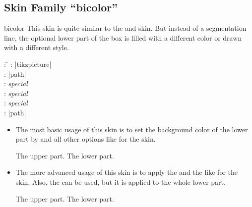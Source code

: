 \subsection{Skin Family \enquote{bicolor}}
\begin{docSkin}{bicolor}
  This skin is quite similar to the  and  skin.
  But instead of a segmentation line, the optional lower part of the box is filled with a
  different color or drawn with a different style.
\begin{tcolorbox}[skintable=bicolor]
  \begin{tabbing}
    : \=\kill
    :  \> |tikzpicture|\\ 
    :           \> |path|\\
    : \> \emph{special}\\ 
    :        \> \emph{special}\\
    :    \> \emph{special}\\
    :           \> |path|
  \end{tabbing}
\end{tcolorbox}
  \begin{itemize}
  \item The most basic usage of this skin is to set the background color of
    the lower part by  and all other options like for
    the  skin.
\begin{dispExample}
\begin{tcolorbox}[skin=bicolor,title=The title,
    colframe=FireBrick!75!black,colback=Salmon!50!white,colbacklower=Salmon]
  The upper part.
  \tcblower
  The lower part.
\end{tcolorbox}
\end{dispExample}
  \item The more advanced usage of this skin is to apply the 
    and the  like for
    the  skin. Also, the  can be
    used, but it is applied to the whole lower part.
\begin{dispExample}
\begin{tcolorbox}[skin=bicolor,title=The title,
    frame style={top color=FireBrick,
                 bottom color=FireBrick!15!white,draw=black},
    interior style={left color=Salmon,right color=Salmon!50!white},
    segmentation style={right color=Salmon,left color=Salmon!50!white}]
  The upper part.
  \tcblower
  The lower part.
\end{tcolorbox}
\end{dispExample}
  \end{itemize}
\end{docSkin}

